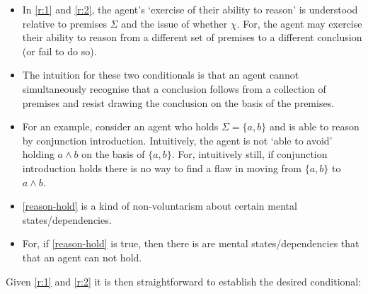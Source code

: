 \documentclass[10pt]{article}
\begin{document}
\begin{itemize}
\item In \ref{r:1} and \ref{r:2}, the agent's `exercise of their ability to reason' is understood relative to premises \(\Sigma\) and the issue of whether \(\chi\).
For, the agent may exercise their ability to reason from a different set of premises to a different conclusion (or fail to do so).
\item The intuition for these two conditionals is that an agent cannot simultaneously recognise that a conclusion follows from a collection of premises and resist drawing the conclusion on the basis of the premises.
\item For an example, consider an agent who holds \(\Sigma = \{a,b\}\) and is able to reason by conjunction introduction.
  Intuitively, the agent is not `able to avoid' holding \(a \land b\) on the basis of \(\{a,b\}\).
  For, intuitively still, if conjunction introduction holds there is no way to find a flaw in moving from \(\{a,b\}\) to \(a \land b\).
\end{itemize}

\begin{itemize}
\item \ref{reason-hold} is a kind of non-voluntarism about certain mental states/dependencies.
\item For, if \ref{reason-hold} is true, then there is are mental states/dependencies that that an agent can not hold.
\end{itemize}


Given \ref{r:1} and \ref{r:2} it is then straightforward to establish the desired conditional:
\end{document}
